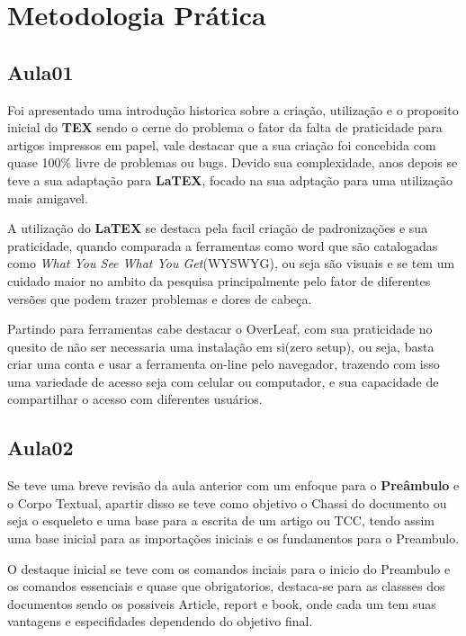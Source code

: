 \documentclass[12pt, a4paper]{article}
\begin{document}
\section{Metodologia Prática}
\subsection{Aula01}
Foi apresentado uma introdução historica sobre a criação, utilização e o proposito inicial do \textbf{TEX} sendo o cerne do problema o fator da falta de praticidade para artigos impressos em papel, vale destacar que a sua criação foi concebida com quase 100\% livre de problemas ou bugs. Devido sua complexidade, anos depois se teve a sua adaptação para \textbf{LaTEX}, focado na sua adptação para uma utilização mais amigavel.


A utilização do \textbf{LaTEX} se destaca pela facil criação de padronizações e sua praticidade, quando comparada a ferramentas como word que são catalogadas como \textit{What You See What You Get}(WYSWYG), ou seja são visuais e se tem um cuidado maior no ambito da pesquisa principalmente pelo fator de diferentes versões que podem trazer problemas e dores de cabeça.


Partindo para ferramentas cabe destacar o OverLeaf, com sua praticidade no quesito de não ser necessaria uma instalação em si(zero setup), ou seja, basta criar uma conta e usar a ferramenta on-line pelo navegador, trazendo com isso uma variedade de acesso seja com celular ou computador, e sua capacidade de compartilhar o acesso com diferentes usuários.




\subsection{Aula02}

Se teve uma breve revisão da aula anterior com um enfoque para o \textbf{Preâmbulo} e o Corpo Textual, apartir disso se teve como objetivo o Chassi do documento ou seja o esqueleto e uma base para a escrita de um artigo ou TCC, tendo assim uma base inicial para as importações iniciais e os fundamentos para o Preambulo.


O destaque inicial se teve com os comandos inciais para o inicio do Preambulo e os comandos essenciais e quase que obrigatorios, destaca-se para as classses dos documentos sendo os possiveis Article, report e book, onde cada um tem suas vantagens e especifidades dependendo do objetivo final.
\end{document}
